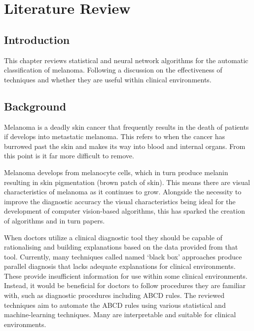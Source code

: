 \cleardoublepage
\chapter{Literature  Review}

\section{Introduction}
This chapter reviews statistical and neural network algorithms for the automatic classification of melanoma. Following a discussion on the effectiveness of techniques and whether they are useful within clinical environments.

\section{Background}

Melanoma is a deadly skin cancer that frequently results in the death of patients if develops into metastatic melanoma. This refers to when the cancer has burrowed past the skin and makes its way into blood and internal organs. From this point is it far more difficult to remove.

Melanoma develops from melanocyte cells, which in turn produce melanin resulting in skin pigmentation (brown patch of skin). This means there are visual characteristics of melanoma as it continues to grow. Alongside the necessity to improve the diagnostic accuracy the visual characteristics being ideal for the development of computer vision-based algorithms, this has sparked the creation of algorithms and in turn papers.

When doctors utilize a clinical diagnostic tool they should be capable of rationalising and building explanations based on the data provided from that tool. Currently, many techniques\cite{Andre2017} called named `black box' approaches produce parallel diagnosis that lacks adequate explanations for clinical environments. These provide insufficient information for use within some clinical environments\cite{Andre2017}. Instead, it would be beneficial for doctors to follow procedures they are familiar with, such as diagnostic procedures including ABCD rules. The reviewed techniques aim to automate the ABCD rules using various statistical and machine-learning techniques. Many are interpretable and suitable for clinical environments.

